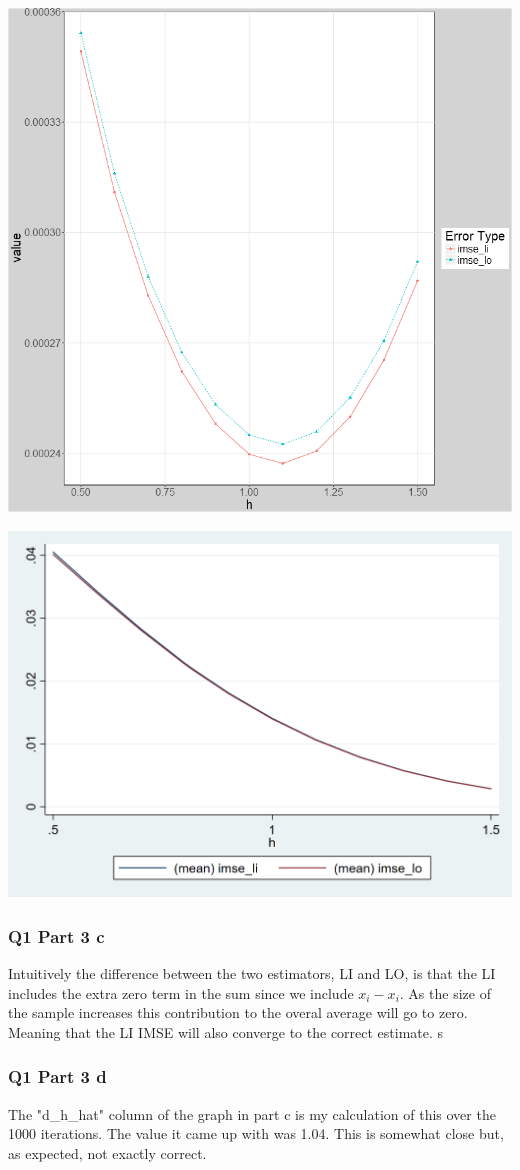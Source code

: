 \documentclass[11pt]{article}
\begin{document}
\begin{center}
		\includegraphics[width=.6\linewidth]{plot_1_3_b.png}

\end{center}
\begin{center}
	\includegraphics[width=.6\linewidth]{stata_plot_1_3_b.png}
	
\end{center}


\subsubsection{Q1 Part 3 c}
Intuitively the difference between the two estimators, LI and LO, is that the LI includes the extra zero term in the sum since we include $x_i - x_i$. As the size of the sample increases this contribution to the overal average will go to zero. Meaning that the LI IMSE will also converge to the correct estimate. s


\subsubsection{Q1 Part 3 d}
The "d\_h\_hat" column of the graph in part c is my calculation of this over the 1000 iterations. The value it came up with was 1.04. This is somewhat close but, as expected, not exactly correct. 
\end{document}
